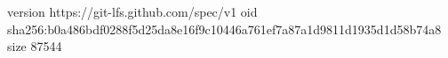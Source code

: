 version https://git-lfs.github.com/spec/v1
oid sha256:b0a486bdf0288f5d25da8e16f9c10446a761ef7a87a1d9811d1935d1d58b74a8
size 87544
